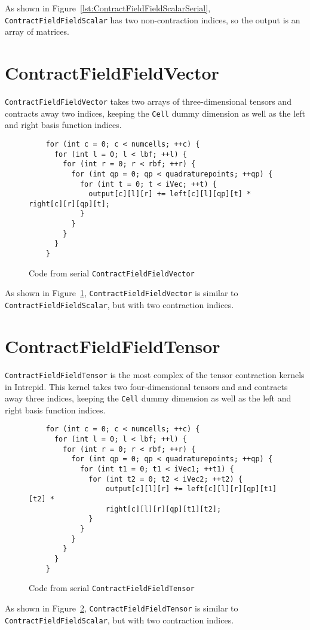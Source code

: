 As shown in Figure~\ref{lst:ContractFieldFieldScalarSerial},
\texttt{ContractFieldFieldScalar} has two non-contraction indices, so the output
is an array of matrices.

\section{ContractFieldFieldVector}
\texttt{ContractFieldFieldVector} takes two arrays of three-dimensional tensors
and contracts away two indices, keeping the \texttt{Cell} dummy dimension as
well as the left and right basis function indices.

\begin{figure}[ht]
    \begin{lstlisting}
    for (int c = 0; c < numcells; ++c) {
      for (int l = 0; l < lbf; ++l) {
        for (int r = 0; r < rbf; ++r) {
          for (int qp = 0; qp < quadraturepoints; ++qp) {
            for (int t = 0; t < iVec; ++t) {
              output[c][l][r] += left[c][l][qp][t] * right[c][r][qp][t];
            }
          }
        }
      }
    }
    \end{lstlisting}
\caption{Code from serial \texttt{ContractFieldFieldVector}
\label{lst:ContractFieldFieldVectorSerial}} 
\end{figure}

As shown in Figure~\ref{lst:ContractFieldFieldVectorSerial},
\texttt{ContractFieldFieldVector} is similar to
\texttt{ContractFieldFieldScalar}, but with two contraction indices.

\section{ContractFieldFieldTensor}
\texttt{ContractFieldFieldTensor} is the most complex of the tensor contraction
kernels in Intrepid.  This kernel takes two four-dimensional tensors and
and contracts away three indices, keeping the \texttt{Cell} dummy dimension as
well as the left and right basis function indices.

\begin{figure}[ht]
    \begin{lstlisting}
    for (int c = 0; c < numcells; ++c) {
      for (int l = 0; l < lbf; ++l) {
        for (int r = 0; r < rbf; ++r) {
          for (int qp = 0; qp < quadraturepoints; ++qp) {
            for (int t1 = 0; t1 < iVec1; ++t1) {
              for (int t2 = 0; t2 < iVec2; ++t2) {
                  output[c][l][r] += left[c][l][r][qp][t1][t2] *
                  right[c][l][r][qp][t1][t2];
              }
            }
          }
        }
      }
    }
    \end{lstlisting}
\caption{Code from serial \texttt{ContractFieldFieldTensor}
\label{lst:ContractFieldFieldTensorSerial}} 
\end{figure}

As shown in Figure~\ref{lst:ContractFieldFieldTensorSerial},
\texttt{ContractFieldFieldTensor} is similar to
\texttt{ContractFieldFieldScalar}, but with two contraction indices.

